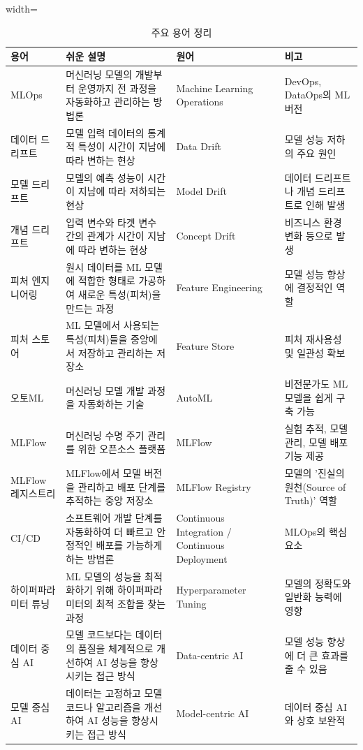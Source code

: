 \documentclass[11pt,a4paper]{article}
\theoremstyle{definition}
\begin{document}
\begin{table}[h!]
\caption{주요 용어 정리}
\label{tab:glossary}
\centering
\begin{adjustbox}{width=\textwidth}
\begin{tabular}{llll}
\toprule
\textbf{용어} & \textbf{쉬운 설명} & \textbf{원어} & \textbf{비고} \\
\midrule
MLOps & 머신러닝 모델의 개발부터 운영까지 전 과정을 자동화하고 관리하는 방법론 & Machine Learning Operations & DevOps, DataOps의 ML 버전 \\
데이터 드리프트 & 모델 입력 데이터의 통계적 특성이 시간이 지남에 따라 변하는 현상 & Data Drift & 모델 성능 저하의 주요 원인 \\
모델 드리프트 & 모델의 예측 성능이 시간이 지남에 따라 저하되는 현상 & Model Drift & 데이터 드리프트나 개념 드리프트로 인해 발생 \\
개념 드리프트 & 입력 변수와 타겟 변수 간의 관계가 시간이 지남에 따라 변하는 현상 & Concept Drift & 비즈니스 환경 변화 등으로 발생 \\
피처 엔지니어링 & 원시 데이터를 ML 모델에 적합한 형태로 가공하여 새로운 특성(피처)을 만드는 과정 & Feature Engineering & 모델 성능 향상에 결정적인 역할 \\
피처 스토어 & ML 모델에서 사용되는 특성(피처)들을 중앙에서 저장하고 관리하는 저장소 & Feature Store & 피처 재사용성 및 일관성 확보 \\
오토ML & 머신러닝 모델 개발 과정을 자동화하는 기술 & AutoML & 비전문가도 ML 모델을 쉽게 구축 가능 \\
MLFlow & 머신러닝 수명 주기 관리를 위한 오픈소스 플랫폼 & MLFlow & 실험 추적, 모델 관리, 모델 배포 기능 제공 \\
MLFlow 레지스트리 & MLFlow에서 모델 버전을 관리하고 배포 단계를 추적하는 중앙 저장소 & MLFlow Registry & 모델의 '진실의 원천(Source of Truth)' 역할 \\
CI/CD & 소프트웨어 개발 단계를 자동화하여 더 빠르고 안정적인 배포를 가능하게 하는 방법론 & Continuous Integration / Continuous Deployment & MLOps의 핵심 요소 \\
하이퍼파라미터 튜닝 & ML 모델의 성능을 최적화하기 위해 하이퍼파라미터의 최적 조합을 찾는 과정 & Hyperparameter Tuning & 모델의 정확도와 일반화 능력에 영향 \\
데이터 중심 AI & 모델 코드보다는 데이터의 품질을 체계적으로 개선하여 AI 성능을 향상시키는 접근 방식 & Data-centric AI & 모델 성능 향상에 더 큰 효과를 줄 수 있음 \\
모델 중심 AI & 데이터는 고정하고 모델 코드나 알고리즘을 개선하여 AI 성능을 향상시키는 접근 방식 & Model-centric AI & 데이터 중심 AI와 상호 보완적 \\
\bottomrule
\end{tabular}
\end{adjustbox}
\end{table}
\end{document}
